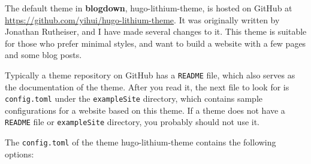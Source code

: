 \documentclass[12pt,]{krantz}
\theoremstyle{definition}
\theoremstyle{definition}
\theoremstyle{definition}
\theoremstyle{remark}
\begin{document}
The default theme in \textbf{blogdown},
hugo-lithium-theme, is hosted on GitHub at
\url{https://github.com/yihui/hugo-lithium-theme}. It was originally
written by Jonathan Rutheiser, and I have made several changes to it.
This theme is suitable for those who prefer minimal styles, and want to
build a website with a few pages and some blog posts.

Typically a theme repository on GitHub has a \texttt{README} file, which
also serves as the documentation of the theme. After you read it, the
next file to look for is \texttt{config.toml} under the
\texttt{exampleSite} directory, which contains sample configurations for
a website based on this theme. If a theme does not have a
\texttt{README} file or \texttt{exampleSite} directory, you probably
should not use it.

The \texttt{config.toml} of the theme hugo-lithium-theme contains the
following options:
\end{document}
